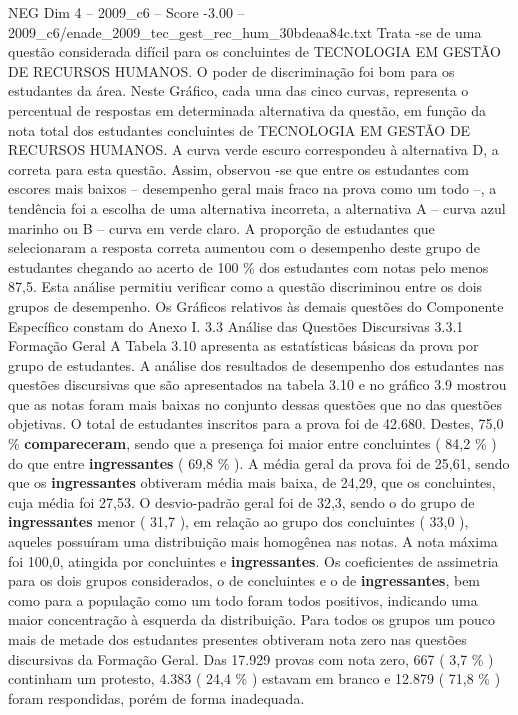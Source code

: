 \begin{textsample}{NEG Dim 4 – 2009\_c6 – Score -3.00 – 2009\_c6/enade\_2009\_tec\_gest\_rec\_hum\_30bdeaa84c.txt}
Trata -se de uma questão considerada difícil para os concluintes de TECNOLOGIA EM GESTÃO DE RECURSOS HUMANOS.
O poder de discriminação foi bom para os estudantes da área.
Neste Gráfico, cada uma das cinco curvas, representa o percentual de respostas em determinada alternativa da questão, em função da nota total dos estudantes concluintes de TECNOLOGIA EM GESTÃO DE RECURSOS HUMANOS.
A curva verde escuro correspondeu à alternativa D, a correta para esta questão.
Assim, observou -se que entre os estudantes com escores mais baixos – desempenho geral mais fraco na prova como um todo –, a tendência foi a escolha de uma alternativa incorreta, a alternativa A – curva azul marinho ou B – curva em verde claro.
A proporção de estudantes que selecionaram a resposta correta aumentou com o desempenho deste grupo de estudantes chegando ao acerto de 100 \% dos estudantes com notas pelo menos 87,5.
Esta análise permitiu verificar como a questão discriminou entre os dois grupos de desempenho.
Os Gráficos relativos às demais questões do Componente Específico constam do Anexo I. 3.3 Análise das Questões Discursivas 3.3.1 Formação Geral A Tabela 3.10 apresenta as estatísticas básicas da prova por grupo de estudantes.
A análise dos resultados de desempenho dos estudantes nas questões discursivas que são apresentados na tabela 3.10 e no gráfico 3.9 mostrou que as notas foram mais baixas no conjunto dessas questões que no das questões objetivas.
O total de estudantes inscritos para a prova foi de 42.680.
Destes, 75,0 \% \textbf{compareceram}, sendo que a presença foi maior entre concluintes ( 84,2 \% ) do que entre \textbf{ingressantes} ( 69,8 \% ).
A média geral da prova foi de 25,61, sendo que os \textbf{ingressantes} obtiveram média mais baixa, de 24,29, que os concluintes, cuja média foi 27,53.
O desvio-padrão geral foi de 32,3, sendo o do grupo de \textbf{ingressantes} menor ( 31,7 ), em relação ao grupo dos concluintes ( 33,0 ), aqueles possuíram uma distribuição mais homogênea nas notas.
A nota máxima foi 100,0, atingida por concluintes e \textbf{ingressantes}.
Os coeficientes de assimetria para os dois grupos considerados, o de concluintes e o de \textbf{ingressantes}, bem como para a população como um todo foram todos positivos, indicando uma maior concentração à esquerda da distribuição.
Para todos os grupos um pouco mais de metade dos estudantes presentes obtiveram nota zero nas questões discursivas da Formação Geral.
Das 17.929 provas com nota zero, 667 ( 3,7 \% ) continham um protesto, 4.383 ( 24,4 \% ) estavam em branco e 12.879 ( 71,8 \% ) foram respondidas, porém de forma inadequada.

\end{textsample}
